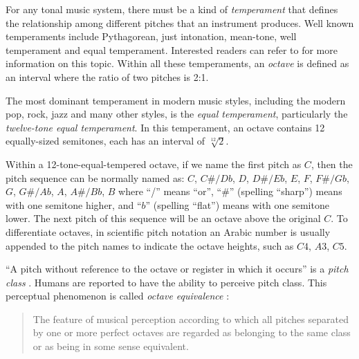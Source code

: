 For any tonal music system, there must be a kind of {\it temperament} that defines the relationship among different pitches that an instrument produces. Well known temperaments include Pythagorean, just intonation, mean-tone, well temperament and equal temperament. Interested readers can refer to \cite{barbour2004tuning} for more information on this topic. Within all these temperaments, an {\it octave} is defined as an interval where the ratio of two pitches is 2:1. %

The most dominant temperament in modern music styles, including the modern pop, rock, jazz and many other styles, is the {\it equal temperament}, particularly the {\it twelve-tone equal temperament}. In this temperament, an octave contains 12 equally-sized semitones, each has an interval of $\sqrt[12]{2} $.

Within a 12-tone-equal-tempered octave, if we name the first pitch as $C$, then the pitch sequence can be normally named as:
$C$, $C\#/Db$, $D$, $D\#/Eb$, $E$, $F$, $F\#/Gb$, $G$, $G\#/Ab$, $A$, $A\#/Bb$, $B$
where ``/'' means ``or'', ``$\#$'' (spelling ``sharp'') means with one semitone higher, and ``$b$'' (spelling ``flat'') means with one semitone lower. The next pitch of this sequence will be an octave above the original $C$. To differentiate octaves, in scientific pitch notation \cite{tuningstandard} an Arabic number is usually appended to the pitch names to indicate the octave heights, such as $C4$, $A3$, $C5$.

``A pitch without reference to the octave or register in which it occurs'' is a {\it pitch class} \cite{randel1999harvard}. Humans are reported to have the ability to perceive pitch class. This perceptual phenomenon is called {\it octave equivalence} \cite{randel1999harvard,boring1942sensation}:

\begin{quote}
The feature of musical perception according to which all pitches separated by one or more perfect octaves are regarded as belonging to the same class or as being in some sense equivalent.
\end{quote}

